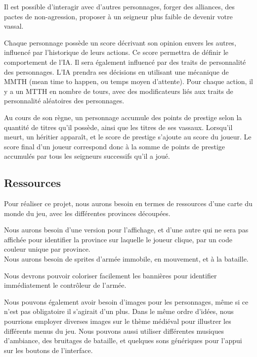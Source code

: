 \documentclass[a4paper,12pt]{article}
\begin{document}
Il est possible d’interagir avec d’autres personnages, forger des alliances, des pactes de non-agression, proposer à un seigneur plus faible de devenir votre vassal. 

Chaque personnage possède un score décrivant son opinion envers les autres, influencé par l’historique de leurs actions. Ce score permettra de définir le comportement de l’IA. Il sera également influencé par des traits de personnalité des personnages.
L’IA prendra ses décisions en utilisant une mécanique de MMTH (mean time to happen, ou temps moyen d’attente). Pour chaque action, il y a un MTTH en nombre de tours, avec des modificateurs liés aux traits de personnalité aléatoires des personnages.

Au cours de son règne, un personnage accumule des points de prestige selon la quantité de titres qu’il possède, ainsi que les titres de ses vassaux. Lorsqu’il meurt, un héritier apparaît, et le score de prestige s’ajoute au score du joueur. Le score final d’un joueur correspond donc à la somme de points de prestige accumulés par tous les seigneurs successifs qu’il a joué. \\


\subsection{Ressources}
Pour réaliser ce projet, nous aurons besoin en termes de ressources d’une carte du monde du jeu, avec les différentes provinces découpées. 

Nous aurons besoin d’une version pour l’affichage, et d’une autre qui ne sera pas affichée pour identifier la province sur laquelle le joueur clique, par un code couleur unique par province. \\

Nous aurons besoin de sprites d’armée immobile, en mouvement, et à la bataille. 

Nous devrons pouvoir coloriser facilement les bannières pour identifier immédiatement le contrôleur de l’armée. 

Nous pouvons également avoir besoin d’images pour les personnages, même si ce n’est pas obligatoire il s’agirait d’un plus. Dans le même ordre d’idées, nous pourrions employer diverses images sur le thème médiéval pour illustrer les différents menus du jeu. Nous pouvons aussi utiliser différentes musiques d’ambiance, des bruitages de bataille, et quelques sons génériques pour l’appui sur les boutons de l’interface. \\
\end{document}
